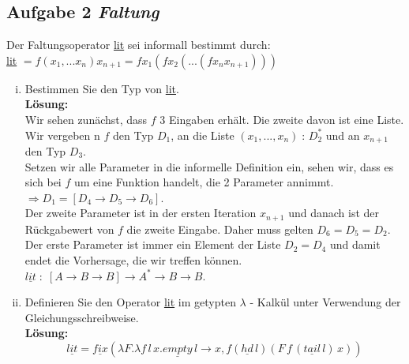 \documentclass[11pt,a4paper,ngerman]{article}
\begin{document}
\subsection*{Aufgabe 2 \mdseries\itshape Faltung}
Der Faltungsoperator \underline{lit} sei informall bestimmt durch:\\
\underline{lit} $= f(x_1,...x_n) x_{n+1} = f x_1 (f x_2 (... (f x_n x_{n+1}) ))$\\

\begin{enumerate}[(i)]
   \item Bestimmen Sie den Typ von \underline{lit}.\\
   \textbf{Lösung:}\\
      Wir sehen zunächst, dass $f$ 3 Eingaben erhält. Die zweite davon ist eine Liste.\\
      Wir vergeben n $f$ den Typ $D_1$, an die Liste $(x_1,...,x_n) \; : \, D_2^*$ und
      an $x_{n+1}$ den Typ $D_3$.\\

      Setzen wir alle Parameter in die informelle Definition ein, sehen wir, dass es sich
      bei $f$ um eine Funktion handelt, die 2 Parameter annimmt.\\
      $\Rightarrow D_1 = [D_4 \rightarrow D_5 \rightarrow D_6]$.\\
      
      Der zweite Parameter ist in der ersten Iteration $x_{n+1}$ und danach ist der 
      Rückgabewert von $f$ die zweite Eingabe. Daher muss gelten $D_6 = D_5 = D_2$.\\

      Der erste Parameter ist immer ein Element der Liste $D_2 = D_4$ und damit endet
      die Vorhersage, die wir treffen können.\\

      $\underline{lit} \; : \; [A \rightarrow B \rightarrow B] \rightarrow A^* \rightarrow B \rightarrow B$.

   \item Definieren Sie den Operator \underline{lit} im getypten 
      $\lambda$ - Kalkül unter Verwendung der Gleichungsschreibweise.\\
    \textbf{Lösung:}\\
         $$
            \underline{lit} = \underline{fix}\left(\lambda F.\lambda f \,l \,x. \underline{empty} \, l
               \rightarrow x, f (\underline{hd} \,l) (F \, f \,(\underline{tail} \,l) \,x)\right)
         $$
      


\end{enumerate}
\end{document}
